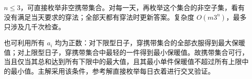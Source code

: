\Legend
$n\le3$，可直接枚举非空携带集合。对每一天，再枚举这个集合的非空子集，看有没有满足当天要求的穿法；全部天都有穿法时更新答案。复杂度 $O(m3^n)$，最多只涉及几千次检查。

也可利用所有 $a_i$ 均为正数：对下限型日子，穿携带集合的全部衣服得到最大保暖值；对上限型日子，穿携带集合中最轻的一件得到最小保暖值。故携带集合可行，当且仅当其总和达到所有下限中的最大值，且其最小单件保暖值不超过所有上限中的最小值。主解采用该条件，参考解直接枚举每日衣着进行交叉验证。

